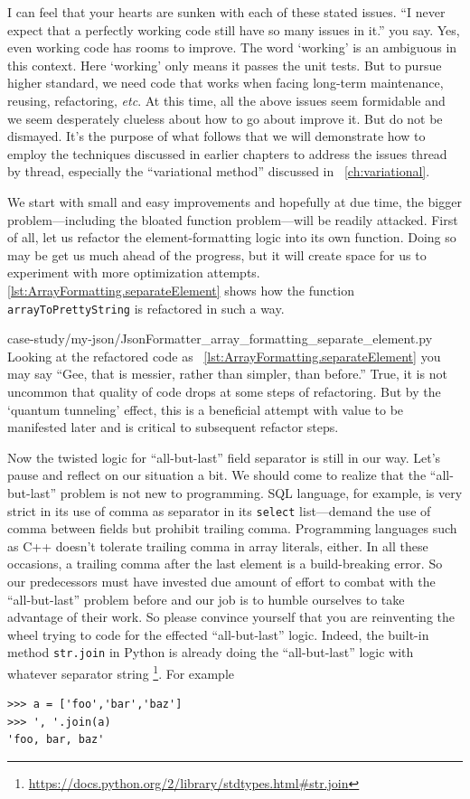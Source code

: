 \documentclass[oneside,11pt]{book}
\makeatletter
\let\LaTeXAtSign=\@
\let\@=\relax
\let\@=\LaTeXAtSign
\theoremstyle{definition}
\theoremstyle{remark}
\newcommand{\code}[1]{\mbox{\lstinline{#1}}}
\newcommand{\python}{Python }
\newcommand{\cpp}{C++ }
\makeatother
\begin{document}
I can feel that your hearts are sunken with each of these stated issues.
``I never expect that a perfectly working code still have so many issues in it.'' you say.
Yes, even working code has rooms to improve.
The word `working' is an ambiguous in this context.
Here `working' only means it passes the unit tests.
But to pursue higher standard, we need code that works when facing long-term maintenance,
reusing, refactoring, \textit{etc}.
At this time, all the above issues seem formidable and we seem desperately clueless about how to
go about improve it.
But do not be dismayed.
It's the purpose of what follows that we will demonstrate how to employ the techniques discussed in
earlier chapters to address the issues thread by thread, especially the ``variational method''
discussed in ~\autoref{ch:variational}.

We start with small and easy improvements and
hopefully at due time, the bigger problem---including the bloated function problem---will be readily
attacked.
First of all, let us refactor the element-formatting logic into its own function.
Doing so may be get us much ahead of the progress,
but it will create space for us to experiment with more optimization attempts.
\@\autoref{lst:ArrayFormatting.separateElement} shows how the function \code{arrayToPrettyString} is
refactored in such a way.

{case-study/my-json/JsonFormatter_array_formatting_separate_element.py}
Looking at the refactored code as ~\autoref{lst:ArrayFormatting.separateElement} you may say
``Gee, that is messier, rather than simpler, than before.''
True, it is not uncommon that quality of code drops at some steps of refactoring.
But by the `quantum tunneling' effect, this is a beneficial attempt with
value to be manifested later and is critical to subsequent refactor steps.

Now the twisted logic for ``all-but-last'' field separator is still in our way.
Let's pause and reflect on our situation a bit.
We should come to realize that the ``all-but-last'' problem is not new to programming.
SQL language, for example, is very strict in its use of comma as separator in its \code{select}
list---demand the use of comma between fields but prohibit trailing comma.
Programming languages such as \cpp doesn't tolerate trailing comma in array literals, either.
In all these occasions, a trailing comma after the last element is a build-breaking error.
So our predecessors must have invested due amount of effort to combat with the ``all-but-last''
problem before and our job is to humble ourselves to take advantage of their work.
So please convince yourself that you are reinventing the wheel trying to code for the effected
``all-but-last'' logic.
Indeed, the built-in method \code{str.join} in \python is already doing the ``all-but-last'' logic
with whatever separator string
\footnote{\url{https://docs.python.org/2/library/stdtypes.html\#str.join}}.
For example
\begin{lstlisting}
>>> a = ['foo','bar','baz']
>>> ', '.join(a)
'foo, bar, baz'
\end{lstlisting}
\end{document}
